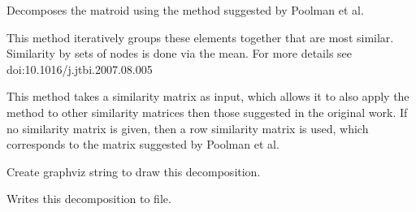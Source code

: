 \documentclass[letterpaper,12pt,english]{sphinxmanual}
\begin{document}
\begin{fulllineitems}
\begin{fulllineitems}
\label{\detokenize{api/modules:cbmpy.fluxmodules.decomposition.Decomposition.poolmanMethod}}
\pysigstartsignatures
\pysiglinewithargsret
{}
{\sphinxparamcomma {}}
{}
\pysigstopsignatures
\sphinxAtStartPar
Decomposes the matroid using the method suggested by Poolman et al.

\sphinxAtStartPar
This method iteratively groups these elements together that are most similar.
Similarity by sets of nodes is done via the mean. For more details see
doi:10.1016/j.jtbi.2007.08.005

\sphinxAtStartPar
This method takes a similarity matrix as input, which allows it to also apply
the method to other similarity matrices then those suggested in the original
work. If no similarity matrix is given, then a row similarity matrix is used,
which corresponds to the matrix suggested by Poolman et al.

\end{fulllineitems}


\begin{fulllineitems}
\label{\detokenize{api/modules:cbmpy.fluxmodules.decomposition.Decomposition.makeGraphViz}}
\pysigstartsignatures
\pysiglinewithargsret
{}
{}
{}
\pysigstopsignatures
\sphinxAtStartPar
Create graphviz string to draw this decomposition.

\end{fulllineitems}


\begin{fulllineitems}
\label{\detokenize{api/modules:cbmpy.fluxmodules.decomposition.Decomposition.write}}
\pysigstartsignatures
\pysiglinewithargsret
{}
{}
{}
\pysigstopsignatures
\sphinxAtStartPar
Writes this decomposition to file.

\end{fulllineitems}


\end{fulllineitems}
\end{document}
